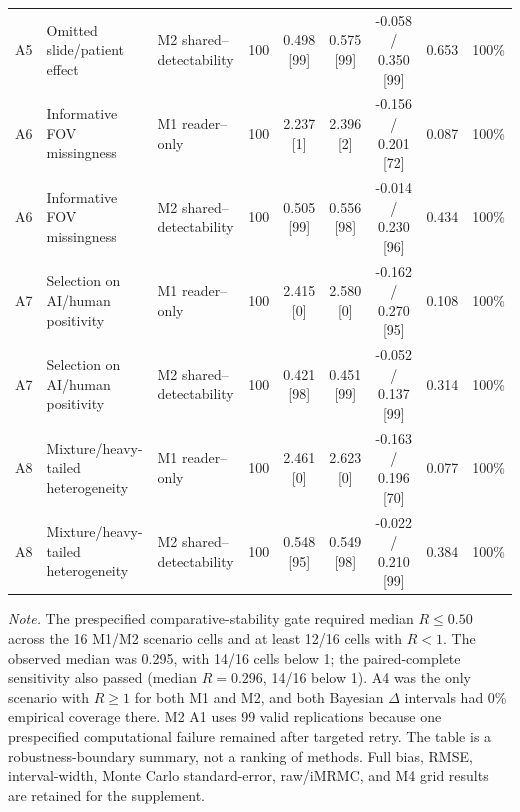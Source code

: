 \begin{table}[!htbp]
{\begin{tabular}{lllrccccc}
A5 & Omitted slide/patient effect & M2 shared--detectability & 100 & 0.498 [99] & 0.575 [99] & -0.058 / 0.350 [99] & 0.653 & 100\% \\
\addlinespace[1.5pt]
A6 & Informative FOV missingness & M1 reader--only & 100 & 2.237 [1] & 2.396 [2] & -0.156 / 0.201 [72] & 0.087 & 100\% \\
A6 & Informative FOV missingness & M2 shared--detectability & 100 & 0.505 [99] & 0.556 [98] & -0.014 / 0.230 [96] & 0.434 & 100\% \\
\addlinespace[1.5pt]
A7 & Selection on AI/human positivity & M1 reader--only & 100 & 2.415 [0] & 2.580 [0] & -0.162 / 0.270 [95] & 0.108 & 100\% \\
A7 & Selection on AI/human positivity & M2 shared--detectability & 100 & 0.421 [98] & 0.451 [99] & -0.052 / 0.137 [99] & 0.314 & 100\% \\
\addlinespace[1.5pt]
A8 & Mixture/heavy-tailed heterogeneity & M1 reader--only & 100 & 2.461 [0] & 2.623 [0] & -0.163 / 0.196 [70] & 0.077 & 100\% \\
A8 & Mixture/heavy-tailed heterogeneity & M2 shared--detectability & 100 & 0.548 [95] & 0.549 [98] & -0.022 / 0.210 [99] & 0.384 & 100\% \\
\bottomrule
\end{tabular}%
}
\vspace{2pt}
\begin{minipage}{0.99\textwidth}
\footnotesize
\textit{Note.} The prespecified comparative-stability gate required median $R\leq0.50$ across the 16 M1/M2 scenario cells and at least 12/16 cells with $R<1$. The observed median was 0.295, with 14/16 cells below 1; the paired-complete sensitivity also passed (median $R=0.296$, 14/16 below 1). A4 was the only scenario with $R\geq1$ for both M1 and M2, and both Bayesian $\Delta$ intervals had 0\% empirical coverage there. M2 A1 uses 99 valid replications because one prespecified computational failure remained after targeted retry. The table is a robustness-boundary summary, not a ranking of methods. Full bias, RMSE, interval-width, Monte Carlo standard-error, raw/iMRMC, and M4 grid results are retained for the supplement.
\end{minipage}
\end{table}

